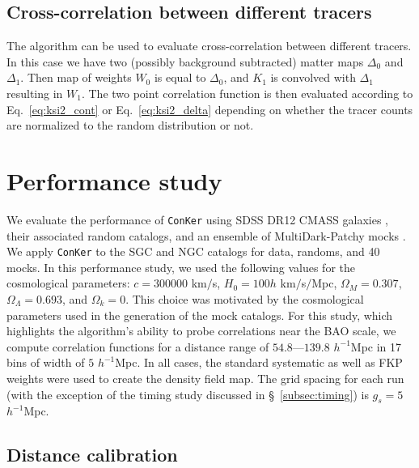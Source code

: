 \documentclass{aa}
\begin{document}
\subsection{Cross-correlation between different tracers} 

The algorithm can be used to evaluate cross-correlation between different tracers. In this case we have two (possibly background subtracted) matter maps $\Delta_0$ and $\Delta_1$. Then map of weights $W_0$ is equal to $\Delta_0$,  and $K_1$ is convolved with $\Delta_1$ resulting in $W_1$. The two point correlation function is then evaluated according to Eq.~\ref{eq:ksi2_cont} or Eq.~\ref{eq:ksi2_delta} depending on whether the tracer counts are normalized to the random distribution or not. 

\section{Performance study}

We evaluate the performance of {\tt ConKer} using SDSS DR12 CMASS galaxies \citep{ross2017clustering}, their associated random catalogs, and an  ensemble of MultiDark-Patchy mocks \citep{kitaura2016clustering,rodriguez2016clustering}. We apply {\tt ConKer} to the SGC and NGC catalogs for data, randoms, and 40 mocks. In this performance study, we used the following values for the cosmological parameters: $c = 300000$ km$/$s, $H_0 = 100h$ km$/$s$/$Mpc, $\Omega_{M} = 0.307$, $\Omega_{\Lambda} = 0.693$, and $\Omega_{k} = 0$. This choice was motivated by the cosmological parameters used in the generation of the mock catalogs. For this study, which highlights the algorithm's ability to probe correlations near the BAO scale, we compute correlation functions for a distance range of $54.8\mbox{---}139.8$ $h^{-1}$Mpc in 17 bins of width of $5$ $h^{-1}$Mpc. In all cases, the standard systematic \citep{ross2017clustering} as well as FKP weights \citep{feldman1993power} were used to create the density field map. The grid spacing for each run (with the exception of the timing study discussed in \S~\ref{subsec:timing}) is $g_s = 5$ $h^{-1}$Mpc. 

\subsection{Distance calibration}
\end{document}
